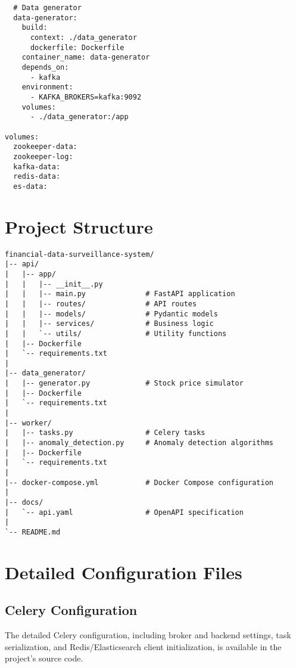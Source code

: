 \begin{verbatim}
  # Data generator
  data-generator:
    build:
      context: ./data_generator
      dockerfile: Dockerfile
    container_name: data-generator
    depends_on:
      - kafka
    environment:
      - KAFKA_BROKERS=kafka:9092
    volumes:
      - ./data_generator:/app

volumes:
  zookeeper-data:
  zookeeper-log:
  kafka-data:
  redis-data:
  es-data:
\end{verbatim}

\section{Project Structure}
\begin{verbatim}
financial-data-surveillance-system/
|-- api/
|   |-- app/
|   |   |-- __init__.py
|   |   |-- main.py              # FastAPI application
|   |   |-- routes/              # API routes
|   |   |-- models/              # Pydantic models
|   |   |-- services/            # Business logic
|   |   `-- utils/               # Utility functions
|   |-- Dockerfile
|   `-- requirements.txt
|
|-- data_generator/
|   |-- generator.py             # Stock price simulator
|   |-- Dockerfile
|   `-- requirements.txt
|
|-- worker/
|   |-- tasks.py                 # Celery tasks
|   |-- anomaly_detection.py     # Anomaly detection algorithms
|   |-- Dockerfile
|   `-- requirements.txt
|
|-- docker-compose.yml           # Docker Compose configuration
|
|-- docs/
|   `-- api.yaml                 # OpenAPI specification
|
`-- README.md
\end{verbatim}

\section{Detailed Configuration Files}

\subsection{Celery Configuration}
The detailed Celery configuration, including broker and backend settings, task serialization, and Redis/Elasticsearch client initialization, is available in the project's source code.
